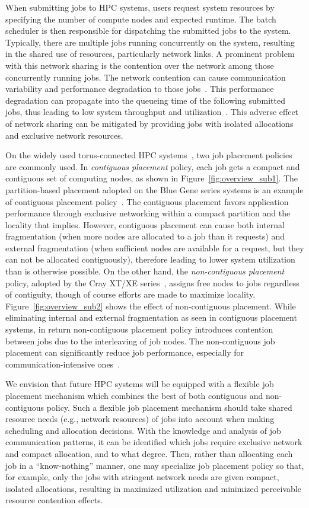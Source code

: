 When submitting jobs to HPC systems, 
users request system resources by specifying the number of compute nodes and expected runtime. 
The batch scheduler is then responsible for dispatching the submitted jobs to the system. 
Typically, there are multiple jobs running concurrently on the system,
resulting in the shared use of resources, particularly network links. 
A prominent problem with this network sharing is the contention over
the network among those concurrently running jobs. 
The network contention can cause communication variability and 
performance degradation to those jobs~\cite{abhinav-sc13}. 
This performance degradation can propagate into the queueing time of the following submitted jobs, 
thus leading to low system throughput and utilization~\cite{jose-ipdps15}. 
This adverse effect of network sharing can be mitigated by 
providing jobs with isolated allocations and exclusive network resources.

On the widely used torus-connected HPC systems~\cite{bgq,tofu,titan}, 
two job placement policies are commonly used. 
In \emph{contiguous placement} policy, 
each job gets a compact and contiguous set of computing nodes, 
as shown in Figure~\ref{fig:overview_sub1}. 
The partition-based placement adopted on the Blue Gene 
series systems is an example of contiguous placement policy~\cite{bgloverview}. 
The contiguous placement favors application performance 
through exclusive networking within a compact partition 
and the locality that implies. 
However, contiguous placement can cause both internal fragmentation 
(when more nodes are allocated to a job than it requests) 
and external fragmentation 
(when sufficient nodes are available for a request, but they can not be allocated contiguously), 
therefore leading to lower system utilization than is otherwise possible. 
On the other hand, the \emph{non-contiguous placement} policy, 
adopted by the Cray XT/XE series~\cite{carl-cug}, 
assigns free nodes to jobs regardless of contiguity, 
though of course efforts are made to maximize locality. 
Figure~\ref{fig:overview_sub2} shows the effect of non-contiguous placement. 
While eliminating internal and external fragmentation as seen in contiguous placement systems, 
in return non-contiguous placement policy introduces contention between jobs due to the interleaving of job nodes. 
The non-contiguous job placement can significantly reduce job performance, 
especially for communication-intensive ones~\cite{abhinav-sc13}.

We envision that future HPC systems will be equipped with 
a flexible job placement mechanism which combines the 
best of both contiguous and non-contiguous policy. 
Such a flexible job placement mechanism should take 
shared resource needs (e.g., network resources) of jobs into account 
when making scheduling and allocation decisions. 
With the knowledge and analysis of job communication patterns, 
it can be identified which jobs require exclusive network and compact allocation, and to what degree. 
Then, rather than allocating each job in a ``know-nothing'' manner, 
one may specialize job placement policy so that, for example, 
only the jobs with stringent network needs are given compact, isolated allocations, 
resulting in maximized utilization and minimized perceivable resource contention effects.


